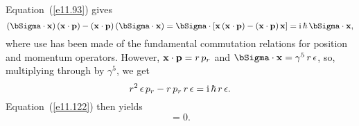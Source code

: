 Equation~(\ref{e11.93}) gives
\begin{equation}
(\bSigma\cdot{\bf x})\,({\bf x}\cdot{\bf p}) - ({\bf x}\cdot{\bf p})\,(\bSigma\cdot{\bf x}) = \bSigma\cdot\left[{\bf x}\,({\bf x}\cdot{\bf p})- ({\bf x}\cdot{\bf p})\,{\bf x}\right] = {\rm i}\,\hbar\,\bSigma\cdot{\bf x},
\end{equation}
where use has been made of the fundamental commutation relations for position and momentum operators. 
However, ${\bf x}\cdot{\bf p}=r\,p_r$ and $\bSigma\cdot{\bf x} = \gamma^5\,r\,\epsilon$, so, multiplying through by $\gamma^5$, we get
\begin{equation}
r^2\,\epsilon\,p_r - r\,p_r\,r\,\epsilon = {\rm i}\,\hbar\,r\,\epsilon.
\end{equation}
Equation~(\ref{e11.122}) then yields
\begin{equation}
[\epsilon,p_r]= 0.
\end{equation}

